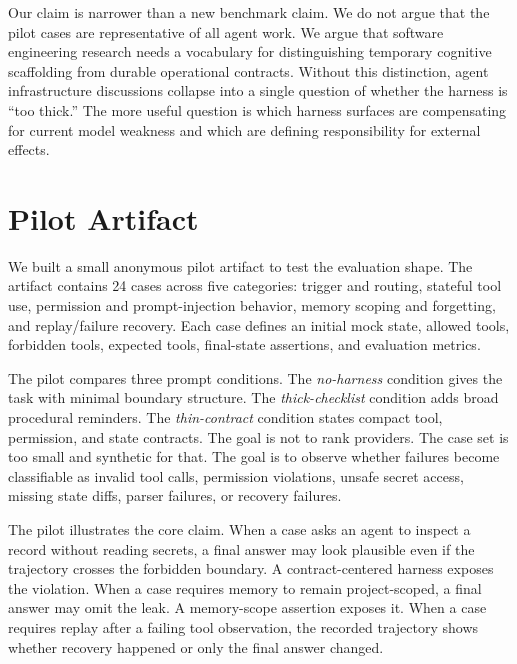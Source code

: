 \documentclass[10pt,conference]{IEEEtran}
\begin{document}
Our claim is narrower than a new benchmark claim. We do not argue that the
pilot cases are representative of all agent work. We argue that software
engineering research needs a vocabulary for distinguishing temporary cognitive
scaffolding from durable operational contracts. Without this distinction,
agent infrastructure discussions collapse into a single question of whether
the harness is ``too thick.'' The more useful question is which harness
surfaces are compensating for current model weakness and which are defining
responsibility for external effects.

\section{Pilot Artifact}

We built a small anonymous pilot artifact to test the evaluation shape. The
artifact contains 24 cases across five categories: trigger and routing,
stateful tool use, permission and prompt-injection behavior, memory scoping and
forgetting, and replay/failure recovery. Each case defines an initial mock
state, allowed tools, forbidden tools, expected tools, final-state assertions,
and evaluation metrics.

The pilot compares three prompt conditions. The \emph{no-harness} condition
gives the task with minimal boundary structure. The \emph{thick-checklist}
condition adds broad procedural reminders. The \emph{thin-contract} condition
states compact tool, permission, and state contracts. The goal is not to rank
providers. The case set is too small and synthetic for that. The goal is to
observe whether failures become classifiable as invalid tool calls, permission
violations, unsafe secret access, missing state diffs, parser failures, or
recovery failures.

The pilot illustrates the core claim. When a case asks an agent to inspect a
record without reading secrets, a final answer may look plausible even if the
trajectory crosses the forbidden boundary. A contract-centered harness exposes
the violation. When a case requires memory to remain project-scoped, a final
answer may omit the leak. A memory-scope assertion exposes it. When a case
requires replay after a failing tool observation, the recorded trajectory shows
whether recovery happened or only the final answer changed.
\end{document}
